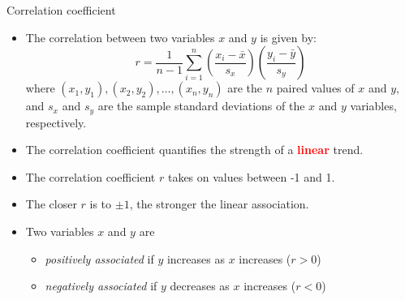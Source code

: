 \documentclass[10pt]{beamer}\usepackage[]{graphicx}\usepackage[]{color}
\begin{document}
						
						\begin{frame}{Correlation coefficient}
							\protect\hypertarget{two-numerical-variables}{}
							
								\begin{itemize}
							
							\item The correlation between two variables $x$ and $y$ is given by:
							$$
							r=\frac{1}{n-1} \sum_{i=1}^{n}\left(\frac{x_{i}-\bar{x}}{s_{x}}\right)\left(\frac{y_{i}-\bar{y}}{s_{y}}\right)
							$$
							where $\left(x_{1}, y_{1}\right),\left(x_{2}, y_{2}\right), \ldots,\left(x_{n}, y_{n}\right)$ are the $n$ paired values of $x$ and $y,$ and $s_{x}$ and $s_{y}$ are the sample standard deviations of the $x$ and $y$ variables, respectively.
							
							
							\pause 
							
							\item The correlation coefficient quantifies the strength of a \textbf{\textcolor{red}{linear}} trend.
							
							\pause
							
								\item
							The correlation coefficient \(r\) takes on values between -1 and 1.
							\pause 
							\item
							The closer \(r\) is to \(\pm 1\), the stronger the linear association.
							\pause 
							
\item 	Two variables \(x\) and \(y\) are
							
							\begin{itemize}
								\item
								\emph{positively associated} if \(y\) increases as \(x\) increases ($r>0$)
								\item
								\emph{negatively associated} if \(y\) decreases as \(x\) increases ($r<0$)
							\end{itemize}
						
													\end{itemize}
							
							
						\end{frame}
						
\end{document}
